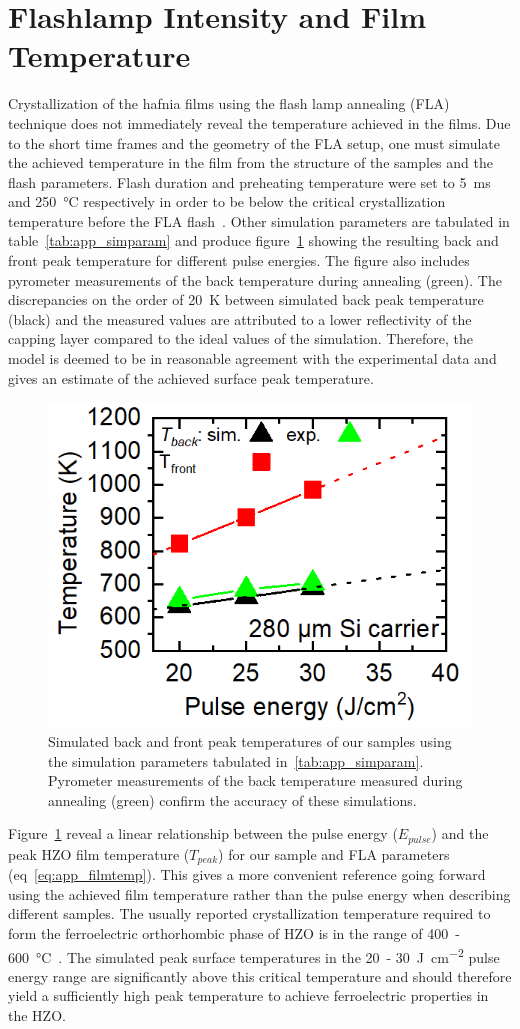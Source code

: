 \documentclass[11pt,twoside]{eitExjobb}
\begin{document}
\section{Flashlamp Intensity and Film Temperature}
Crystallization of the hafnia films using the flash lamp annealing (FLA)
technique does not immediately reveal the temperature achieved in the films. Due
to the short time frames and the geometry of the FLA setup, one must simulate
the achieved temperature in the film from the structure of the samples and the
flash parameters. Flash duration and preheating temperature were set to
\SI{5}{\milli\second} and \SI{250}{\celsius} respectively in order to be below
the critical crystallization temperature before the FLA
flash~\cite{migita2019phase}. Other simulation parameters are tabulated in
table~\ref{tab:app_simparam} and produce figure~\ref{fig:res_Comsol} showing the
resulting back and front peak temperature for different pulse energies. The figure also
includes pyrometer measurements of the back temperature during annealing
(green). The discrepancies on the order of \SI{20}{\kelvin} between simulated
back peak temperature (black) and the measured values are attributed to a 
lower reflectivity of the  capping layer compared to the ideal values of
the simulation. Therefore, the model is deemed to be in reasonable agreement
with the experimental data and gives an estimate of the achieved surface peak temperature.

\begin{figure}[htbp]
    \centering
    \includegraphics[width=.41\linewidth]{fig/COMSOLFlashInt.png}
    \caption{Simulated back and front peak temperatures of our samples using the
    simulation parameters tabulated in~\ref{tab:app_simparam}. Pyrometer
    measurements of the back temperature measured during annealing (green) confirm
    the accuracy of these simulations.}\label{fig:res_Comsol}
\end{figure}

Figure~\ref{fig:res_Comsol} reveal a linear relationship between the pulse
energy ($E_{pulse}$) and the peak HZO film temperature ($T_{peak}$) for our
sample and FLA parameters (eq~\ref{eq:app_filmtemp}). This gives a more
convenient reference going forward using the achieved film temperature rather
than the pulse energy when describing different samples. The usually reported
crystallization temperature required to form the ferroelectric orthorhombic
phase of HZO is in the range of 400~-
\SI{600}{\celsius}~\cite{muller2012ferroelectricity, athle2022improved}.
The simulated peak surface temperatures in the 20~-
\SI{30}{\joule\per\square\centi\meter} pulse energy range are significantly
above this critical temperature and should therefore yield a sufficiently high
peak temperature to achieve ferroelectric properties in the HZO.\@
\end{document}

